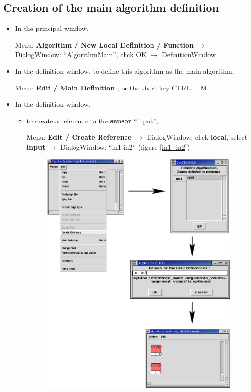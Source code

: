 \documentclass[a4paper,twoside]{report}
\begin{document}
\subsection{Creation of the main algorithm definition}
\begin{itemize}
\item In the principal window, 

Menu: \textbf{Algorithm / New Local Definition / Function} $\rightarrow$
DialogWindow: ``AlgorithmMain'', click OK $\rightarrow$ DefinitionWindow

\item In the definition window, to define this algorithm as the main algorithm,

Menu: \textbf{Edit / Main Definition} ; or the short key CTRL + M

\item In the definition window,
\begin{itemize}
\item to create a reference to the \textbf{sensor} ``input'',

Menu: \textbf{Edit / Create Reference}
$\rightarrow$ DialogWindow: click \textbf{local}, select \textbf{input}
$\rightarrow$ DialogWindow: ``in1 in2'' (figure \ref{in1_in2})

\begin{figure}[htbp]
        \begin{center} 
        \includegraphics[width=\linewidth]{Edit_CreateReference.eps}
        \end{center}


\end{figure}
\end{itemize}
\end{itemize}
\end{document}
